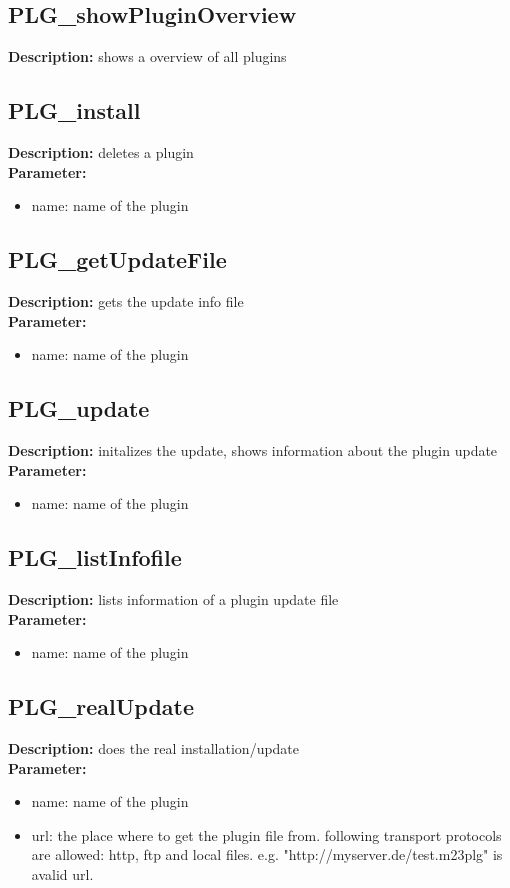 \subsection{PLG\_showPluginOverview}
\textbf{Description:} shows a overview of all plugins\\

\subsection{PLG\_install}
\textbf{Description:} deletes a plugin\\
\textbf{Parameter:}
\begin{itemize}
\item name: name of the plugin
\end{itemize}

\subsection{PLG\_getUpdateFile}
\textbf{Description:} gets the update info file\\
\textbf{Parameter:}
\begin{itemize}
\item name: name of the plugin
\end{itemize}

\subsection{PLG\_update}
\textbf{Description:} initalizes the update, shows information about the plugin update\\
\textbf{Parameter:}
\begin{itemize}
\item name: name of the plugin
\end{itemize}

\subsection{PLG\_listInfofile}
\textbf{Description:} lists information of a plugin update file\\
\textbf{Parameter:}
\begin{itemize}
\item name: name of the plugin
\end{itemize}

\subsection{PLG\_realUpdate}
\textbf{Description:} does the real installation/update\\
\textbf{Parameter:}
\begin{itemize}
\item name: name of the plugin
\item url: the place where to get the plugin file from. following transport protocols are allowed: http, ftp and local files. e.g. "http://myserver.de/test.m23plg" is avalid url.
\end{itemize}

